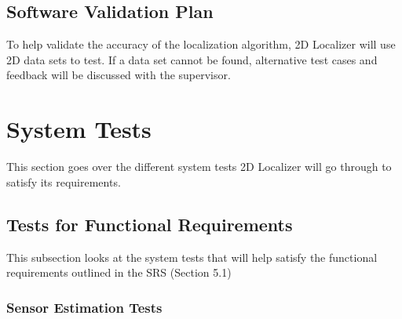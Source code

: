 \documentclass[12pt, titlepage]{article}
\begin{document}

\subsection{Software Validation Plan}\label{plan_software}

To help validate the accuracy of the localization algorithm, 2D Localizer will use 2D data sets to test. If a data set cannot be found, alternative test cases and feedback will be discussed with the supervisor.




\section{System Tests}\label{sec_sys-tests}

This section goes over the different system tests 2D Localizer will go through to satisfy its requirements.


\subsection{Tests for Functional Requirements}



This subsection looks at the system tests that will help satisfy the functional requirements outlined in the SRS (Section 5.1)

\subsubsection{Sensor Estimation Tests}
\end{document}
